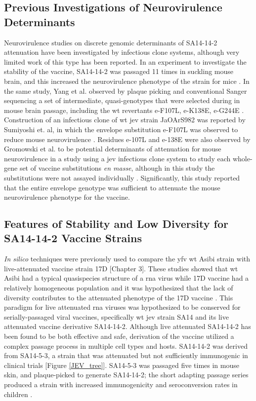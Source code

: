 \subsection{Previous Investigations of Neurovirulence Determinants}
Neurovirulence studies on discrete genomic determinants of SA14-14-2 attenuation have been investigated by infectious clone systems, although very limited work of this type has been reported. In an experiment to investigate the stability of the vaccine, SA14-14-2 was passaged 11 times in suckling mouse brain, and this increased the neurovirulence phenotype of the strain for mice \parencite{Yang:2014io}. In the same study, Yang et al. observed by plaque picking and conventional Sanger sequencing a set of intermediate, quasi-genotypes that were selected during in mouse brain passage, including the \gls{wt} revertants \gls{e}-F107L, \gls{e}-K138E, \gls{e}-G244E \parencite{Yang:2014io}. Construction of an infectious clone of \gls{wt} \gls{jev} strain JaOArS982 was reported by Sumiyoshi et. al, in which the envelope substitution \gls{e}-F107L was observed to reduce mouse neurovirulence \parencite{Sumiyoshi:1992vf,Sumiyoshi:1995fl}. Residues \gls{e}-107L and \gls{e}-138E were also observed by Gromowski et al. to be potential determinants of attenuation for mouse neurovirulence in a study using a \gls{jev} infectious clone system to study each whole-gene set of vaccine substitutions \emph{en masse}, although in this study the substitutions were not assayed individually \parencite{Gromowski:2015et}. Significantly, this study reported that the entire envelope genotype was sufficient to attenuate the mouse neurovirulence phenotype for the vaccine.
\subsection{Features of Stability and Low Diversity for SA14-14-2 Vaccine Strains}
\emph{In silico} techniques were previously used to compare the \gls{yfv} \gls{wt} Asibi strain with live-attenuated vaccine strain 17D [Chapter 3]. These studies showed that \gls{wt} Asibi had a typical quasispecies structure of a \gls{rna} virus while 17D vaccine had a relatively homogeneous population and it was hypothesized that the lack of diversity contributes to the attenuated phenotype of the 17D vaccine \parencite{Beck:2014cm}. This paradigm for live attenuated \gls{rna} viruses was hypothesized to be conserved for serially-passaged viral vaccines, specifically \gls{wt} \gls{jev} strain SA14 and its live attenuated vaccine derivative SA14-14-2. Although live attenuated SA14-14-2 has been found to be both effective and safe, derivation of the vaccine utilized a complex passage process in multiple cell types and hosts. SA14-14-2 was derived from SA14-5-3, a strain that was attenuated but not sufficiently immunogenic in clinical trials [Figure \ref{JEV_tree}]. SA14-5-3 was passaged five times in mouse skin, and plaque-picked to generate SA14-14-2; the short adapting passage series produced a strain with increased immunogenicity and seroconversion rates in children \parencite{Huang:1982jd}. 

